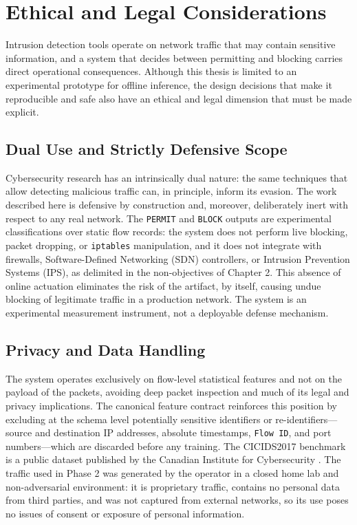 \chapter{Ethical and Legal Considerations}

Intrusion detection tools operate on network traffic that may contain sensitive information, and a system that decides between permitting and blocking carries direct operational consequences. Although this thesis is limited to an experimental prototype for offline inference, the design decisions that make it reproducible and safe also have an ethical and legal dimension that must be made explicit.

\section{Dual Use and Strictly Defensive Scope}
Cybersecurity research has an intrinsically dual nature: the same techniques that allow detecting malicious traffic can, in principle, inform its evasion. The work described here is defensive by construction and, moreover, deliberately inert with respect to any real network. The \texttt{PERMIT} and \texttt{BLOCK} outputs are experimental classifications over static flow records: the system does not perform live blocking, packet dropping, or \texttt{iptables} manipulation, and it does not integrate with firewalls, Software-Defined Networking (SDN) controllers, or Intrusion Prevention Systems (IPS), as delimited in the non-objectives of Chapter 2. This absence of online actuation eliminates the risk of the artifact, by itself, causing undue blocking of legitimate traffic in a production network. The system is an experimental measurement instrument, not a deployable defense mechanism.

\section{Privacy and Data Handling}
The system operates exclusively on flow-level statistical features and not on the payload of the packets, avoiding deep packet inspection and much of its legal and privacy implications. The canonical feature contract reinforces this position by excluding at the schema level potentially sensitive identifiers or re-identifiers---source and destination IP addresses, absolute timestamps, \texttt{Flow ID}, and port numbers---which are discarded before any training. The CICIDS2017 benchmark is a public dataset published by the Canadian Institute for Cybersecurity \parencite{Sharafaldin2018CICIDS2017,CICIDS2017Web}. The traffic used in Phase 2 was generated by the operator in a closed home lab and non-adversarial environment: it is proprietary traffic, contains no personal data from third parties, and was not captured from external networks, so its use poses no issues of consent or exposure of personal information.

